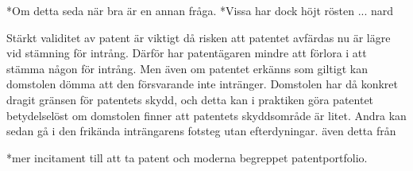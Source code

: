 *Om detta seda när bra är en
annan fråga. 
*Vissa har dock höjt rösten ... nard

Stärkt validitet av patent är viktigt då risken att patentet avfärdas nu är lägre vid stämning för
intrång. Därför har patentägaren mindre att förlora i att stämma någon för intrång. Men
även om patentet erkänns som giltigt kan domstolen dömma att den försvarande inte intränger.
Domstolen har då konkret dragit gränsen för patentets skydd, och detta kan i praktiken göra patentet
betydelselöst om domstolen finner att patentets skyddsområde är litet. Andra kan sedan gå i den frikända
inträngarens fotsteg utan efterdyningar. även detta från \cite{henry}

*mer incitament till att ta patent och moderna begreppet patentportfolio. 

